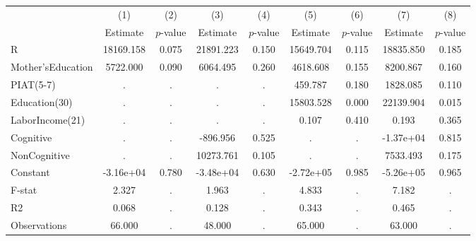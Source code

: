 \begin{tabular}{lcccccccc} \toprule
 & (1) & (2) & (3) & (4) & (5) & (6) & (7) & (8) \\ 
 & Estimate  & $p$-value  & Estimate  & $p$-value  & Estimate  & $p$-value  & Estimate  & $p$-value  \\  \midrule
R & 18169.158 &     0.075 & 21891.223 &     0.150 & 15649.704 &     0.115 & 18835.850 &     0.185 \\  
Mother'sEducation &  5722.000 &     0.090 &  6064.495 &     0.260 &  4618.608 &     0.155 &  8200.867 &     0.160 \\  
PIAT(5-7) &         . &         . &         . &         . &   459.787 &     0.180 &  1828.085 &     0.110 \\  
Education(30) &         . &         . &         . &         . & 15803.528 &     0.000 & 22139.904 &     0.015 \\  
LaborIncome(21) &         . &         . &         . &         . &     0.107 &     0.410 &     0.193 &     0.365 \\  
Cognitive &         . &         . &  -896.956 &     0.525 &         . &         . & -1.37e+04 &     0.815 \\  
NonCognitive &         . &         . & 10273.761 &     0.105 &         . &         . &  7533.493 &     0.175 \\  
Constant & -3.16e+04 &     0.780 & -3.48e+04 &     0.630 & -2.72e+05 &     0.985 & -5.26e+05 &     0.965 \\  
F-stat &     2.327 &         . &     1.963 &         . &     4.833 &         . &     7.182 &         . \\  \midrule 
R2 &     0.068 &         . &     0.128 &         . &     0.343 &         . &     0.465 &         . \\  
Observations &    66.000 &         . &    48.000 &         . &    65.000 &         . &    63.000 &         . \\  
\bottomrule \end{tabular}
